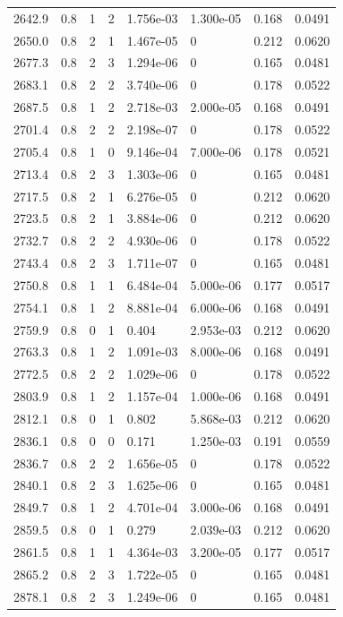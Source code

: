 \documentclass[preview]{standalone}
\begin{document}
{{{{{{\begin{tabular}{L{1.2cm}C{1.2cm} C{0.3cm}C{0.5cm} C{1.4cm}C{1.4cm} C{1.4cm}C{1.4cm}}
  2642.9  &   0.8  & 1     &  2 &  1.756e-03  & 1.300e-05  & 0.168 &  0.0491   \\ 
  2650.0  &   0.8  & 2     &  1 &  1.467e-05  & 0  & 0.212 &  0.0620   \\ 
  2677.3  &   0.8  & 2     &  3 &  1.294e-06  & 0  & 0.165 &  0.0481   \\ 
  2683.1  &   0.8  & 2     &  2 &  3.740e-06  & 0  & 0.178 &  0.0522   \\ 
  2687.5  &   0.8  & 1     &  2 &  2.718e-03  & 2.000e-05  & 0.168 &  0.0491   \\ 
  2701.4  &   0.8  & 2     &  2 &  2.198e-07  & 0  & 0.178 &  0.0522   \\ 
  2705.4  &   0.8  & 1     &  0 &  9.146e-04  & 7.000e-06  & 0.178 &  0.0521   \\ 
  2713.4  &   0.8  & 2     &  3 &  1.303e-06  & 0  & 0.165 &  0.0481   \\ 
  2717.5  &   0.8  & 2     &  1 &  6.276e-05  & 0  & 0.212 &  0.0620   \\ 
  2723.5  &   0.8  & 2     &  1 &  3.884e-06  & 0  & 0.212 &  0.0620   \\ 
  2732.7  &   0.8  & 2     &  2 &  4.930e-06  & 0  & 0.178 &  0.0522   \\ 
  2743.4  &   0.8  & 2     &  3 &  1.711e-07  & 0  & 0.165 &  0.0481   \\ 
  2750.8  &   0.8  & 1     &  1 &  6.484e-04  & 5.000e-06  & 0.177 &  0.0517   \\ 
  2754.1  &   0.8  & 1     &  2 &  8.881e-04  & 6.000e-06  & 0.168 &  0.0491   \\ 
  2759.9  &   0.8  & 0     &  1 &  0.404  & 2.953e-03  & 0.212 &  0.0620   \\ 
  2763.3  &   0.8  & 1     &  2 &  1.091e-03  & 8.000e-06  & 0.168 &  0.0491   \\ 
  2772.5  &   0.8  & 2     &  2 &  1.029e-06  & 0  & 0.178 &  0.0522   \\ 
  2803.9  &   0.8  & 1     &  2 &  1.157e-04  & 1.000e-06  & 0.168 &  0.0491   \\ 
  2812.1  &   0.8  & 0     &  1 &  0.802  & 5.868e-03  & 0.212 &  0.0620   \\ 
  2836.1  &   0.8  & 0     &  0 &  0.171  & 1.250e-03  & 0.191 &  0.0559   \\ 
  2836.7  &   0.8  & 2     &  2 &  1.656e-05  & 0  & 0.178 &  0.0522   \\ 
  2840.1  &   0.8  & 2     &  3 &  1.625e-06  & 0  & 0.165 &  0.0481   \\ 
  2849.7  &   0.8  & 1     &  2 &  4.701e-04  & 3.000e-06  & 0.168 &  0.0491   \\ 
  2859.5  &   0.8  & 0     &  1 &  0.279  & 2.039e-03  & 0.212 &  0.0620   \\ 
  2861.5  &   0.8  & 1     &  1 &  4.364e-03  & 3.200e-05  & 0.177 &  0.0517   \\ 
  2865.2  &   0.8  & 2     &  3 &  1.722e-05  & 0  & 0.165 &  0.0481   \\ 
  2878.1  &   0.8  & 2     &  3 &  1.249e-06  & 0  & 0.165 &  0.0481   \\ 
\hline 
\end{tabular} 

}}}}}}
\end{document}
